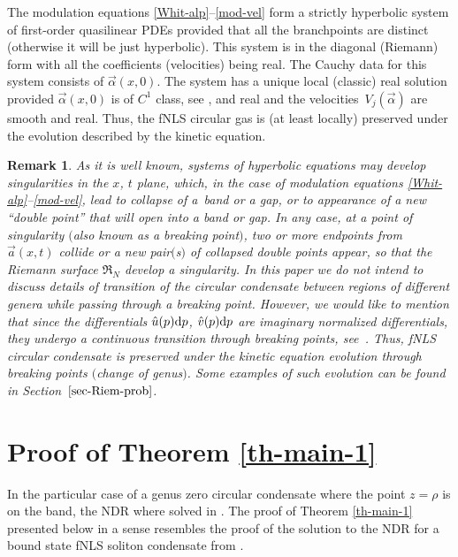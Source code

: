 \documentclass[10pt,a4paper]{amsart}
\numberwithin{equation}{section}
\newtheorem{Remark}[Theorem]{Remark}
\def\a{\alpha}
\begin{document}
The modulation equations
\eqref{Whit-alp}--\eqref{mod-vel} form a strictly hyperbolic system of first-order quasilinear PDEs provided that all the branchpoints are distinct (otherwise it will be just hyperbolic). This system is in the diagonal (Riemann) form with all the coefficients (velocities) being real. The Cauchy data for this system consists of $\vec\a(x,0)$. The system has a unique local (classic) real solution provided $\vec\a(x,0)$ is of $C^1$ class, see \cite[Theorem 7.8.1]{DafBook}, and real and the velocities~$V_j(\vec\a)$ are smooth and real. Thus, the fNLS circular gas is (at least locally) preserved under the evolution described by the kinetic equation.

\begin{Remark}\label{rem-break}
As it is well known, systems of hyperbolic equations may develop singularities in the $x$, $t$ plane, which, in the case of modulation equations \eqref{Whit-alp}--\eqref{mod-vel}, lead to collapse of a~band or a gap, or to appearance of a new ``double point'' that will open into a band or gap. In any case, at a point of singularity $($also known as a breaking point$)$, two or more endpoints from~$\vec a(x,t)$ collide or a new pair$($s$)$ of collapsed double points appear, so that the Riemann surface $\mathfrak R_N$ develop a singularity.
In this paper we do not intend to discuss details of transition of the circular condensate between regions of different genera while passing through a breaking point.
However, we would like to mention that
since the differentials $\hat u(p){\rm d}p$, $\hat v(p){\rm d}p$
are imaginary normalized differentials, they undergo a continuous transition through breaking points, see~{\rm \cite{BT14}}. Thus, fNLS circular condensate is preserved under the kinetic equation evolution through breaking points $($change of genus$)$. Some examples of such evolution can be found in Section~$\ref{sec-Riem-prob}$.
\end{Remark}

\section{Proof of Theorem \ref{th-main-1}}\label{s2}
In the particular case of a genus zero circular condensate where the point $z=\rho$ is on the band, the NDR where solved in \cite{ET2020}.
The proof of Theorem \ref{th-main-1} presented below in a sense resembles the proof of the solution to the NDR for a bound state fNLS soliton condensate from
\cite{KT2021}.
\end{document}
